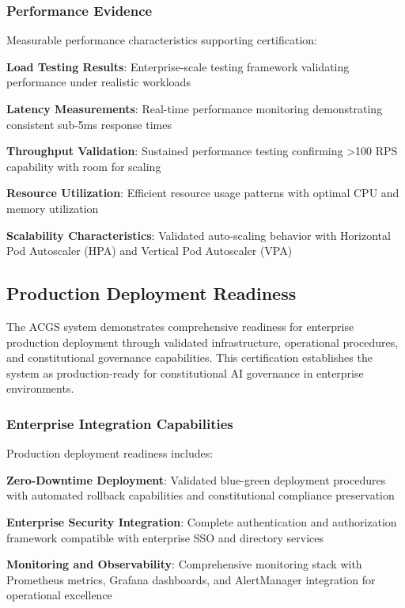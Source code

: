 \subsubsection{Performance Evidence}
Measurable performance characteristics supporting certification:

\noindent\textbf{Load Testing Results}: Enterprise-scale testing framework validating performance under realistic workloads

\noindent\textbf{Latency Measurements}: Real-time performance monitoring demonstrating consistent sub-5ms response times

\noindent\textbf{Throughput Validation}: Sustained performance testing confirming >100 RPS capability with room for scaling

\noindent\textbf{Resource Utilization}: Efficient resource usage patterns with optimal CPU and memory utilization

\noindent\textbf{Scalability Characteristics}: Validated auto-scaling behavior with Horizontal Pod Autoscaler (HPA) and Vertical Pod Autoscaler (VPA)

\subsection{Production Deployment Readiness}
\label{subsec:deployment_readiness}

The ACGS system demonstrates comprehensive readiness for enterprise production deployment through validated infrastructure, operational procedures, and constitutional governance capabilities. This certification establishes the system as production-ready for constitutional AI governance in enterprise environments.

\subsubsection{Enterprise Integration Capabilities}
Production deployment readiness includes:

\noindent\textbf{Zero-Downtime Deployment}: Validated blue-green deployment procedures with automated rollback capabilities and constitutional compliance preservation

\noindent\textbf{Enterprise Security Integration}: Complete authentication and authorization framework compatible with enterprise SSO and directory services

\noindent\textbf{Monitoring and Observability}: Comprehensive monitoring stack with Prometheus metrics, Grafana dashboards, and AlertManager integration for operational excellence

